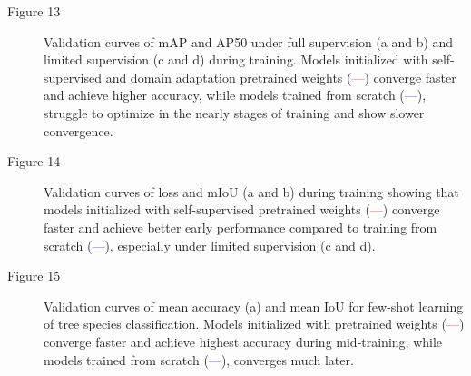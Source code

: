 \documentclass[review,authoryear]{elsarticle}
\begin{document}
\begin{description}
\item[Figure 13] Validation curves of mAP and AP50 under full supervision (a and b) and limited supervision (c and d) during training. Models initialized with self-supervised and domain adaptation pretrained weights (\textcolor{red}{---}) converge faster and achieve higher accuracy, while models trained from scratch (\textcolor{blue}{---}), struggle to optimize in the nearly stages of training and show slower convergence.
\item[Figure 14] Validation curves of loss and mIoU (a and b) during training showing that models initialized with self-supervised pretrained weights (\textcolor{red}{---}) converge faster and achieve better early performance compared to training from scratch (\textcolor{blue}{---}), especially under limited supervision (c and d).
\item[Figure 15] Validation curves of mean accuracy (a) and mean IoU for few-shot learning of tree species classification. Models initialized with pretrained weights (\textcolor{red}{---}) converge faster and achieve highest accuracy during mid-training, while models trained from scratch (\textcolor{blue}{---}), converges much later.

\end{description}
\end{document}
